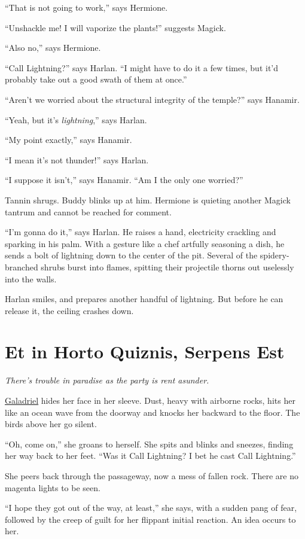 \documentclass[smalldemyvopaper,11pt,twoside,onecolumn,openright,extrafontsizes]{memoir}
\newcommand{\chapdesc}[1]{
    \begin{flushright}
    \emph{{#1}}
    \end{flushright}
    \vspace{26pt}
}
\begin{document}
``That is not going to work,'' says Hermione.

``Unshackle me! I will vaporize the plants!'' suggests Magick.

``Also no,'' says Hermione.

``Call Lightning?'' says Harlan. ``I might have to do it a few times,
but it'd probably take out a good swath of them at once.''

``Aren't we worried about the structural integrity of the temple?'' says
Hanamir.

``Yeah, but it's \emph{lightning},'' says Harlan.

``My point exactly,'' says Hanamir.

``I mean it's not thunder!'' says Harlan.

``I suppose it isn't,'' says Hanamir. ``Am I the only one worried?''

Tannin shrugs. Buddy blinks up at him. Hermione is quieting another
Magick tantrum and cannot be reached for comment.

``I'm gonna do it,'' says Harlan. He raises a hand, electricity
crackling and sparking in his palm. With a gesture like a chef artfully
seasoning a dish, he sends a bolt of lightning down to the center of the
pit. Several of the spidery-branched shrubs burst into flames, spitting
their projectile thorns out uselessly into the walls.

Harlan smiles, and prepares another handful of lightning. But before he
can release it, the ceiling crashes down.


\chapter{Et in Horto Quiznis, Serpens Est}
\chapdesc{There's trouble in paradise as the party is rent asunder.}

\href{/characters/galadriel/}{Galadriel} hides her face in her sleeve.
Dust, heavy with airborne rocks, hits her like an ocean wave from the
doorway and knocks her backward to the floor. The birds above her go
silent.

``Oh, come on,'' she groans to herself. She spits and blinks and
sneezes, finding her way back to her feet. ``Was it Call Lightning? I
bet he cast Call Lightning.''

She peers back through the passageway, now a mess of fallen rock. There
are no magenta lights to be seen.

``I hope they got out of the way, at least,'' she says, with a sudden
pang of fear, followed by the creep of guilt for her flippant initial
reaction. An idea occurs to her.
\end{document}
